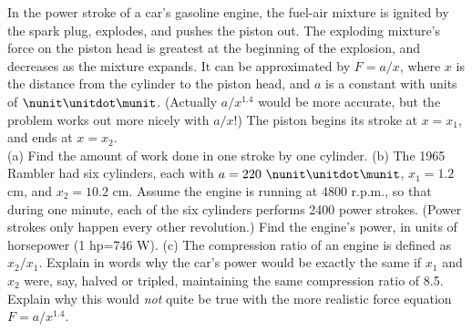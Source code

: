 In the power stroke of a car's gasoline engine, the
fuel-air mixture is ignited by the spark plug, explodes, and
pushes the piston out. The exploding mixture's force on the
piston head is greatest at the beginning of the explosion,
and decreases as the mixture expands. It can be approximated
by $F=a/x$, where $x$ is the distance from the cylinder to
the piston head, and $a$ is a constant with units of $\nunit\unitdot\munit$.
(Actually $a/x^{1.4}$ would be more accurate, but the problem
works out more nicely with $a/x$!) The piston begins its
stroke at $x=x_1$, and ends at $x=x_2$. \\
(a) Find the amount of 
work done in one stroke by one cylinder.\answercheck\hwendpart
(b) The 1965 Rambler had
six cylinders, each with $a=220\ \nunit\unitdot\munit$, $x_1=1.2$ cm, and $x_2=10.2$ cm.
Assume the engine is running at 4800 r.p.m., so that 
during one minute, each of the six cylinders performs 2400
power strokes. (Power strokes only happen every other
revolution.) Find the engine's power, in units of horsepower (1 hp=746 W).\answercheck\hwendpart
(c) The compression ratio of an engine is defined as
$x_2/x_1$. Explain in words why the car's power would be
exactly the same if $x_1$ and $x_2$ were, say, halved or
tripled, maintaining the same compression ratio of 8.5.
Explain why this would \emph{not} quite be true with the
more realistic force equation $F=a/x^{1.4}$.
